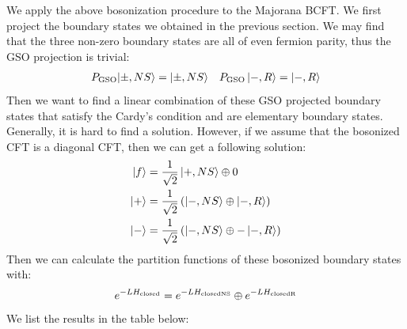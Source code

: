 We apply the above bosonization procedure to the Majorana BCFT. We first project the boundary states we obtained in the previous section. We may find that the three non-zero boundary states are all of even fermion parity, thus the GSO projection is trivial:
\begin{align}
  P_{\mathrm{GSO}} | \pm, NS \rangle = | \pm, NS \rangle
\quad  P_{\mathrm{GSO}} \ket{-,R} = \ket{-,R}
\end{align}
Then we want to find a linear combination of these GSO projected boundary states that satisfy the Cardy's condition and are elementary boundary states. Generally, it is hard to find a solution. However, if we assume that the bosonized CFT is a diagonal CFT, then we can get a following solution:
\begin{align}
  \ket{f} &= \displaystyle\frac{1}{\sqrt{2}}\ket{+,NS} \oplus 0 \\ 
  \ket{+} &= \frac{1}{\sqrt{2}}\left(\ket{-,NS} \oplus \ket{-,R}\right) \\ 
  \ket{-} &= \frac{1}{\sqrt{2}}\left(\ket{-,NS} \oplus -\ket{-,R}\right)
\end{align}
Then we can calculate the partition functions of these bosonized boundary states with:
\begin{align}
  e^{-L H_{\rm closed}} = e^{-L H_{\rm closed NS}} \oplus e^{-L H_{\rm closed R}}
\end{align}
We list the results in the table below:

